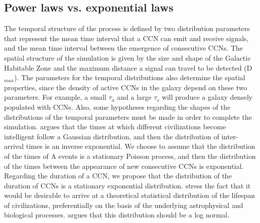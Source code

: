 \documentclass[crop]{CSLB}
\newcommand{\ceti}{CCN}
\newcommand{\cetis}{CCNs}
\begin{document}
    
 
\subsection{Power laws vs. exponential laws}\label{SS_PDF_shape}

The temporal structure of the process is defined by two distribution
parameters that represent the mean time interval that a \ceti{}
can emit and receive signals, and the mean time interval
between the emergence of consecutive \cetis{}.
%
The spatial structure of the simulation is given by the size and shape
of the Galactic Habitable Zone and the maximum distance a signal can
travel to be detected (D$_{max}$).
%
The parameters for the temporal distributions also determine the
spatial properties, since the density of active \cetis{} in the galaxy
depend on these two parameters.
%
For example, a small $\tau_a$ and a large $\tau_s$ will produce a
galaxy densely populated with \cetis{}.
%
Also, some hypotheses regarding the shapes of the distributions of the
temporal parameters must be made in order to complete the
simulation.
%
\citet{forgan_spatiotemporal_2011} argues that the times at which
different civilizations become intelligent follow a Gaussian
distribution, and then the distribution of inter-arrival times is an
inverse exponential.
%
We choose to assume that the distribution of the times of A events is a
stationary Poisson process, and then the distribution of the times
between the appearance of new consecutive \cetis{} is exponential.
%
Regarding the duration of a \ceti{}, we propose that the distribution
of the duration of \cetis{} is a stationary exponential distribution.
%
\citet{balbi_impact_2018} stress the fact that it would be desirable
to arrive at a theoretical statistical distribution of the lifespan of
civilizations, preferentially on the basis of the underlying
astrophysical and biological processes.
%
\citet{maccone_lognormals_2014} argues that this distribution should
be a log normal.
\end{document}
